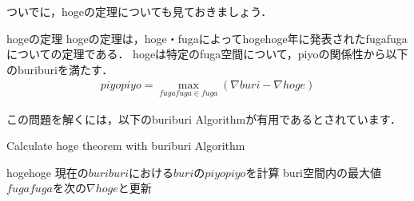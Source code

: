 \documentclass[11pt, a4paper, titlepage]{jsarticle} %
\begin{document}
ついでに，hogeの定理についても見ておきましょう．

\begin{itembox}[l]{hogeの定理}
    hogeの定理は，hoge・fugaによってhogehoge年に発表されたfugafugaについての定理である．
    hogeは特定のfuga空間について，piyoの関係性から以下のburiburiを満たす．
    \begin{align*}
        piyopiyo = \max_{fugafuga \in fuga} \left(\nabla buri - \nabla hoge \right)
    \end{align*}
\end{itembox}

この問題を解くには，以下のburiburi Algorithmが有用であるとされています．
\begin{algorithm}[H]
    \caption{Calculate hoge theorem with buriburi Algorithm}
    \label{BRA}
    \begin{algorithmic}[1]
        \STATE hogehoge
        \STATE 現在の$buriburi$における$buri$の$piyopiyo$を計算
        \STATE buri空間内の最大値$fugafuga$を次の$\nabla hoge$と更新
        \ENDFOR
    \end{algorithmic}
    \end{algorithm}
\end{document}
